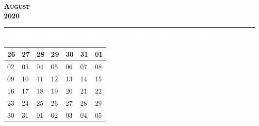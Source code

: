 \documentclass{article}
\newcommand{\daysize}{2.5cm}		%
\newcommand{\dw}{3.5cm}					%
\newcommand{\mkday}[1]{
  #1
  \vspace{\daysize}
}
\begin{document}
		\begin{center}
			\textsc{\LARGE \textbf{\textcolor{black}{
			August
			}}}\\ %
			\textsc{\large \textbf{\textcolor{black}{
			2020
			}}} %
		\end{center}

		\begin{center}
		\begin{tabular}{| p{\dw} | p{\dw} | p{\dw} | p{\dw} | p{\dw} | p{\dw} | p{\dw} |}
			\hline
			\cellcolor{bannercolor} \textcolor{white}{Sunday} &
			\cellcolor{bannercolor} \textcolor{white}{Monday} &
			\cellcolor{bannercolor} \textcolor{white}{Tuesday} &
			\cellcolor{bannercolor} \textcolor{white}{Wednesday} &
			\cellcolor{bannercolor} \textcolor{white}{Thursday} &
			\cellcolor{bannercolor} \textcolor{white}{Friday} &
			\cellcolor{bannercolor} \textcolor{white}{Saturday} \\
			\hline
		\end{tabular}

		\vspace{0.1cm}

		\begin{tabular}{| p{\dw} | p{\dw} | p{\dw} | p{\dw} | p{\dw} | p{\dw} | p{\dw} |}
\hline 
\cellcolor{weekendcolor}\mkday{
    26
} & 
\mkday{
    27
} &
\mkday{
    28
} &
\mkday{
    29
} &
\mkday{
    30
} &
\mkday{
    31
} &
\cellcolor{weekendcolor}\mkday{
    01
} 
\\
\hline 
\cellcolor{weekendcolor}\mkday{
    02
} & 
\mkday{
    03
} &
\mkday{
    04
} &
\mkday{
    05
} &
\mkday{
    06
} &
\mkday{
    07
} &
\cellcolor{weekendcolor}\mkday{
    08
} 
\\
\hline 
\cellcolor{weekendcolor}\mkday{
    09
} & 
\mkday{
    10
} &
\mkday{
    11
} &
\mkday{
    12
} &
\mkday{
    13
} &
\mkday{
    14
} &
\cellcolor{weekendcolor}\mkday{
    15
} 
\\
\hline 
\cellcolor{weekendcolor}\mkday{
    16
} & 
\mkday{
    17
} &
\mkday{
    18
} &
\mkday{
    19
} &
\mkday{
    20
} &
\mkday{
    21
} &
\cellcolor{weekendcolor}\mkday{
    22
} 
\\
\hline 
\cellcolor{weekendcolor}\mkday{
    23
} & 
\mkday{
    24
} &
\mkday{
    25
} &
\mkday{
    26
} &
\mkday{
    27
} &
\mkday{
    28
} &
\cellcolor{weekendcolor}\mkday{
    29
} 
\\
\hline 
\cellcolor{weekendcolor}\mkday{
    30
} & 
\mkday{
    31
} &
\mkday{
    01
} &
\mkday{
    02
} &
\mkday{
    03
} &
\mkday{
    04
} &
\cellcolor{weekendcolor}\mkday{
    05
} 
\\
		\end{tabular}

		\end{center}
\end{document}
